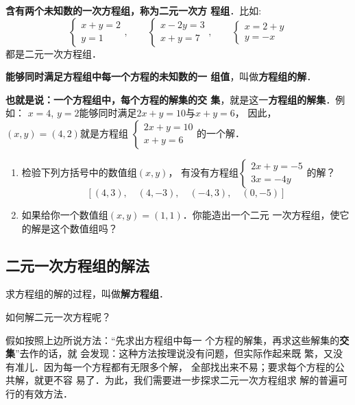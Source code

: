\textbf{含有两个未知数的一次方程组，称为二元一次方
程组}．比如:
\[\begin{cases}
    x+y=2\\
    y=1 
 \end{cases},\qquad \begin{cases}
     x-2y=3\\
     x+y=7
 \end{cases},\qquad \begin{cases}
    x=2+y\\
    y=-x
\end{cases}\]   
都是二元一次方程组．

\textbf{能够同时满足方程组中每一个方程的未知数的一
组值}，叫做\textbf{方程组的解}．

\textbf{也就是说：一个方程组中，每个方程的解集的交
集}，就是这一\textbf{方程组的解集}．例如：
    $x=4$,  $y=2$能够同时满足$2x+y=10$与$x+y=6$，
因此，$(x,y)=(4,2)$就是方程组
$\begin{cases}
    2x+y=10\\
    x+y=6 
 \end{cases}$的一个解．

\begin{ex}
\begin{enumerate}
    \item 检验下列方括号中的数值组$(x,y)$，
    有没有方程组$\begin{cases}
        2x+y=-5\\
        3x=-4y 
     \end{cases}$的解？
    \[[(4,3),\quad (4,-3),\quad (-4,3), \quad (0,-5)  ] \]

    \item 如果给你一个数值组$(x,  y) = (1,1)$．你能造出一个二元
    一次方程组，使它的解是这个数值组吗？
\end{enumerate}
\end{ex}

\subsection{二元一次方程组的解法}
    求方程组的解的过程，叫做\textbf{解方程组}．

    如何解二元一次方程呢？

    假如按照上边所说方法：“先求出方程组中每一
个方程的解集，再求这些解集的\textbf{交集}”去作的话，就
会发现：这种方法按理说没有问题，但实际作起来既
繁，又没有准儿．因为每一个方程都有无限多个解，
全部找出来不易；要求每个方程的公共解，就更不容
易了．为此，我们需要进一步探求二元一次方程组求
解的普遍可行的有效方法．

